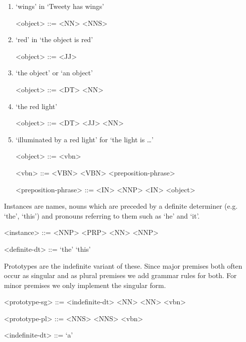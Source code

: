 \begin{enumerate}
    \item `wings' in `Tweety has wings'
    \begin{grammar}
        <object> ::= <NN> \alt <NNS>
    \end{grammar}

    \item `red' in `the object is red'
    \begin{grammar}
        <object> ::= <JJ>
    \end{grammar}

    \item `the object' or `an object'
    \begin{grammar}
        <object> ::= <DT> <NN>
    \end{grammar}

    \item `the red light'
    \begin{grammar}
        <object> ::= <DT> <JJ> <NN>
    \end{grammar}

    \item `illuminated by a red light' for `the light is …'
    \begin{grammar}
        <object> ::= <vbn>

        <vbn> ::= <VBN>
        \alt <VBN> <preposition-phrase>

        <preposition-phrase> ::= <IN> <NNP>
        \alt <IN> <object>
    \end{grammar}
\end{enumerate}

Instances are names, nouns which are preceded by a definite determiner (e.g. `the', `this') and pronouns referring to them such as `he' and `it'.

\begin{grammar}
<instance> ::= <NNP>
\alt <PRP>
 <NN>
 <NNP>

<definite-dt> ::= `the' \alt `this'
\end{grammar}

Prototypes are the indefinite variant of these. Since major premises both often occur as singular and as plural premises we add grammar rules for both. For minor premises we only implement the singular form.

\begin{grammar}
<prototype-sg> ::= <indefinite-dt> <NN>
 <NN> <vbn>

<prototype-pl> ::= <NNS>
\alt <NNS> <vbn>

<indefinite-dt> ::= `a'
\end{grammar}

